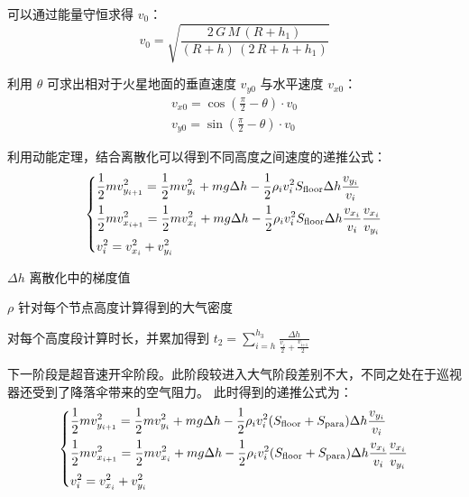 \documentclass[hyperref,a4paper,UTF8]{ctexart}
\begin{document}
\smallskip
可以通过能量守恒求得 $v_0$：
\[
    v_0 = \sqrt{\frac{2\,G\,M\,{\left(R+h_1 \right)}}
        {{\left(R+h\right)}\,{\left(2\,R+h+h_1 \right)}}}
\]

利用 $\theta $ 可求出相对于火星地面的垂直速度 $v_{y0}$ 与水平速度 $v_{x0}$：
\begin{gather*}
    v_{x0} = \cos (\frac{\pi }{2} - \theta ) \cdot v_0 \\
    v_{y0} = \sin (\frac{\pi }{2} - \theta ) \cdot v_0
\end{gather*}

利用动能定理，结合离散化可以得到不同高度之间速度的递推公式：
\[
    \begin{dcases}
        \frac{1}{2}mv_{y_{i + 1}}^2 = \frac{1}{2}mv_{y_{i}}^2 + mg\Delta h -
        \frac{1}{2}\rho _iv_i^2S_{\text{floor}}\Delta h\frac{v_{y_i}}{v_i}                        \\
        \frac{1}{2}mv_{x_{i + 1}}^2 = \frac{1}{2}mv_{x_{i}}^2 + mg\Delta h -
        \frac{1}{2}\rho _iv_i^2S_{\text{floor}}\Delta h\frac{v_{x_i}}{v_i}\frac{v_{x_i}}{v_{y_i}} \\
        v_i^2 = v_{x_i}^2 + v_{y_i}^2
    \end{dcases}
\]
\begin{eqexpl}[0mm]
    \item{$\Delta h$} 离散化中的梯度值
    \item{$\rho$} 针对每个节点高度计算得到的大气密度
\end{eqexpl}
\smallskip

对每个高度段计算时长，并累加得到
$
    \displaystyle t_2=\sum_{i=h}^{h_3}{\displaystyle\frac{\Delta h}{\frac{\displaystyle v_i}
        {\displaystyle 2}+\frac{\displaystyle v_{\textrm{i+1}} }{\displaystyle 2}}}
$

\medskip
\bigskip
下一阶段是超音速开伞阶段。此阶段较进入大气阶段差别不大，不同之处在于巡视器还受到了降落伞带来的空气阻力。
此时得到的递推公式为：
\[
    \begin{dcases}
        \frac{1}{2}mv_{y_{i + 1}}^2 = \frac{1}{2}mv_{y_{i}}^2 + mg\Delta h -
        \frac{1}{2}\rho _iv_i^2(S_{\text{floor}}+S_{\text{para}})\Delta h\frac{v_{y_i}}{v_i} \\
        \frac{1}{2}mv_{x_{i + 1}}^2 = \frac{1}{2}mv_{x_{i}}^2 + mg\Delta h -
        \frac{1}{2}\rho _iv_i^2(S_{\text{floor}}+S_{\text{para}})\Delta h\frac{v_{x_i}}{v_i}
        \frac{v_{x_i}}{v_{y_i}}                                                              \\
        v_i^2 = v_{x_i}^2 + v_{y_i}^2
    \end{dcases}
\]
\end{document}
